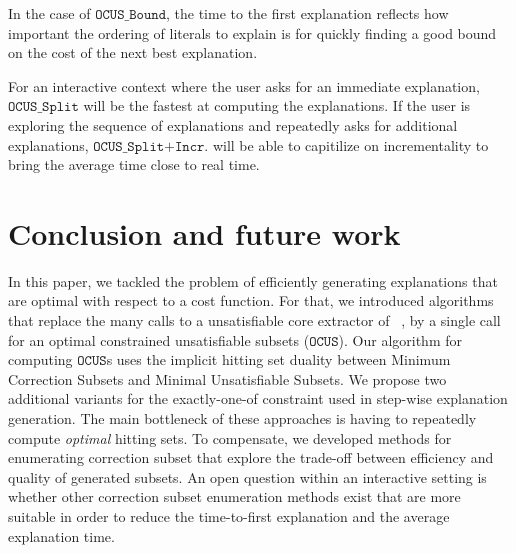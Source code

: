 \documentclass[twoside,11pt]{article}
\newcommand\citet[1]{\citeauthor{#1}~\citeyear{#1}}
\newcommand\comment[1]{\marginpar{\tiny #1}}
\renewcommand\comment[1]{#1}
\newcommand{\tias}[1]{{\comment{\color{blue}Tias:#1}}}
\newcommand{\emilio}[1]{{\comment{\color{red}Emilio: #1}}}
\newcommand\mm[1]{\ensuremath{#1}\xspace}
\newcommand\call[1]{\mm{\texttt{#1}}}
\newcommand\comus{\mm{\call{OCUS}}}
\newcommand{\comusbound}{\mm{\call{OCUS\_Bound}}}
\newcommand{\comussplit}{\mm{\call{OCUS\_Split}}}
\newcommand\ousbiterincr{\mm{\call{OCUS\_Split+Incr.}}}
\begin{document}
In the case of \emph{\comusbound}, the time to the first explanation reflects how important the ordering of literals to explain is for quickly finding a good bound on the cost of the next best explanation. 

For an interactive context where the user asks for an immediate explanation, \emph{\comussplit} will be the fastest at computing the explanations. 
If the user is exploring the sequence of explanations and repeatedly asks for additional explanations, \ousbiterincr will be able to capitilize on incrementality to bring the average time close to real time.




\section{Conclusion and future work}


In this paper, we tackled the problem of efficiently generating explanations that are optimal with respect to a cost function.
%
%
For that, we introduced algorithms that replace the many calls to a unsatisfiable core extractor of \citet{bogaerts2021framework}, by a single call for an optimal constrained unsatisfiable subsets (\comus).
Our algorithm for computing \comus{}s uses the implicit hitting set duality between Minimum Correction Subsets and Minimal Unsatisfiable Subsets. 
We propose two additional variants for the exactly-one-of constraint used in step-wise explanation generation.
The main bottleneck of these approaches is having to repeatedly compute \emph{optimal} hitting sets.
To compensate, we developed methods for enumerating correction subset that explore the trade-off between efficiency and quality of generated subsets. 
An open question within an interactive setting is whether other correction subset enumeration methods exist that are more suitable in order to reduce the time-to-first explanation and the average explanation time.
\end{document}

